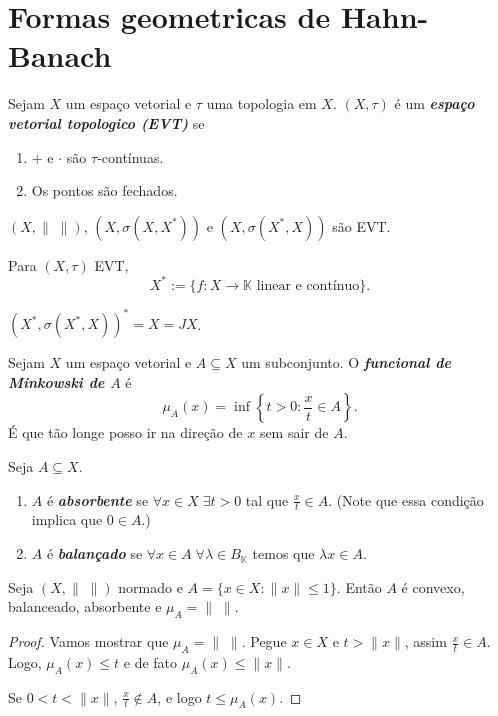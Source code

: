 \documentclass[portuguese]{article}
\theoremstyle{definition}
\begin{document}
	\section{Formas geometricas de Hahn-Banach}
	\begin{defn}
		Sejam $X$ um espaço vetorial e $\tau$ uma topologia em $X$. $(X,\tau)$ é um \textbf{\textit{espaço vetorial topologico (EVT)}} se
		\begin{enumerate}
			\item $+$ e $\cdot$ são $\tau$-contínuas.
			\item Os pontos são fechados.
		\end{enumerate}
	\end{defn}
	\begin{exemplo}
		$(X,\|\;\|)$, $(X,\sigma(X,X^*))$ e $(X,\sigma(X^*,X))$ são EVT.
	\end{exemplo}
	\begin{defn}
		Para $(X,\tau)$ EVT,
		\[X^*:=\{f:X\to\mathbb{K}\text{ linear e contínuo}\}.\]
	\end{defn}
	\begin{obs}
		$(X^*,\sigma(X^*,X))^*=X=JX$.
	\end{obs}
	\begin{defn}
		Sejam $X$ um espaço vetorial e $A\subseteq X$ um subconjunto. O \textbf{\textit{funcional de Minkowski de $A$}} é
		\[\mu_A(x)=\inf\left\{t>0:\frac{x}{t}\in A\right\}.\]
		{\color{persiangreen}É que tão longe posso ir na direção de $x$ sem sair de $A$.}
	\end{defn}
	\begin{defn}
		Seja $A\subseteq X$.
		\begin{enumerate}
			\item $A$ é \textbf{\textit{absorbente}} se $\forall x\in X\;\exists t>0$ tal que $\frac{x}{t}\in A$. (Note que essa condição implica que $0\in A$.)
			\item $A$ é \textbf{\textit{balançado}} se $\forall x\in A\;\forall\lambda\in B_\mathbb{K}$ temos que $\lambda x\in A$.
		\end{enumerate}
	\end{defn}
	\begin{prop}
		Seja $(X,\|\;\|)$ normado e $A=\{x\in X:\| x\|\leq1\}$. Então $A$ é convexo, balanceado, absorbente e $\mu_A=\|\;\|$.
	\end{prop}
	\begin{proof}
		Vamos mostrar que $\mu_A=\|\;\|$. Pegue $x\in X$ e $t>\| x\|$, assim $\frac{x}{t}\in A$. Logo, $\mu_A(x)\leq t$ e de fato $\mu_A(x)\leq\| x\|$.
		
		Se $0<t<\| x\|$, $\frac{x}{t}\notin A$, e logo $t\leq\mu_A(x)$.
	\end{proof}
	
\end{document}
